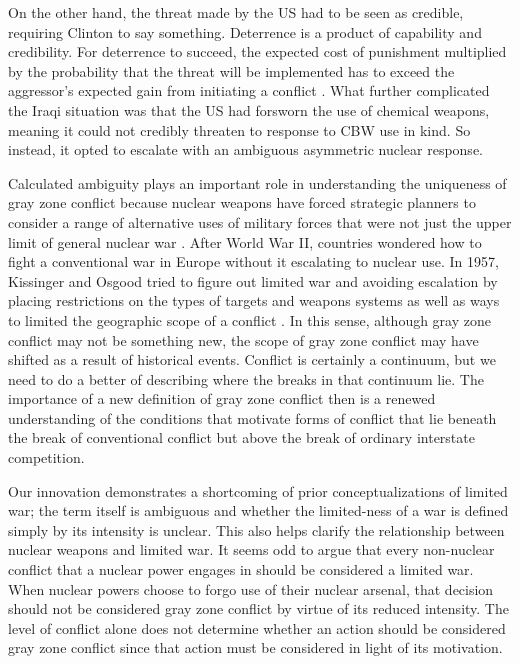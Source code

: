 \documentclass[12pt,letterpaper]{article}
\begin{document}
		On the other hand, the threat made by the US had to be seen as credible, requiring Clinton to say something. Deterrence is a product of capability and credibility. For deterrence to succeed, the expected cost of punishment multiplied by the probability that the threat will be implemented has to exceed the aggressor's expected gain from initiating a conflict \citep{sagan_commitmenttrapwhy_2000}. What further complicated the Iraqi situation was that the US had forsworn the use of chemical weapons, meaning it could not credibly threaten to response to CBW use in kind. So instead, it opted to escalate with an ambiguous asymmetric nuclear response.
				
		Calculated ambiguity plays an important role in understanding the uniqueness of gray zone conflict because nuclear weapons have forced strategic planners to consider a range of alternative uses of military forces that were not just the upper limit of general nuclear war \citep{stephens_transformationlowintensity_1994}. After World War II, countries wondered how to fight a conventional war in Europe without it escalating to nuclear use. In 1957, Kissinger and Osgood tried to figure out limited war and avoiding escalation by placing restrictions on the types of targets and weapons systems as well as ways to limited the geographic scope of a conflict \citep{woodman_defininglimitedconflict_1991}. In this sense, although gray zone conflict may not be something new, the scope of gray zone conflict may have shifted as a result of historical events. Conflict is certainly a continuum, but we need to do a better of describing where the breaks in that continuum lie. The importance of a new definition of gray zone conflict then is a renewed understanding of the conditions that motivate forms of conflict that lie beneath the break of conventional conflict but above the break of ordinary interstate competition.
				
		Our innovation demonstrates a shortcoming of prior conceptualizations of limited war; the term itself is ambiguous and whether the limited-ness of a war is defined simply by its intensity is unclear. This also helps clarify the relationship between nuclear weapons and limited war. It seems odd to argue that every non-nuclear conflict that a nuclear power engages in should be considered a limited war. When nuclear powers choose to forgo use of their nuclear arsenal, that decision should not be considered gray zone conflict by virtue of its reduced intensity. The level of conflict alone does not determine whether an action should be considered gray zone conflict since that action must be considered in light of its motivation.
				
\end{document}
